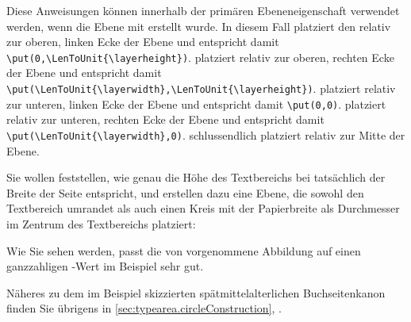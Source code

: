 \begin{Declaration}
\end{Declaration}
Diese Anweisungen können innerhalb der
primären Ebeneneigenschaft  verwendet werden, wenn die Ebene
mit  erstellt wurde. In diesem Fall platziert
 den  relativ zur oberen, linken Ecke der Ebene und
entspricht damit
\lstinline[breaklines=false]|\put(0,\LenToUnit{\layerheight})|. 
platziert  relativ zur oberen, rechten Ecke der Ebene und
entspricht damit
\lstinline[breaklines=false]
|\put(\LenToUnit{\layerwidth},\LenToUnit{\layerheight})|.
\iffree{}{\unskip\linebreak}%
 platziert  relativ zur unteren, linken Ecke der
Ebene und entspricht damit
\lstinline[breaklines=false]|\put(0,0)|.  platziert
 relativ zur unteren, rechten Ecke der Ebene und entspricht
damit
\lstinline[breaklines=false]|\put(\LenToUnit{\layerwidth},0)|. 
schlussendlich platziert  relativ zur Mitte der Ebene.%
%
\begin{Example}
  Sie wollen feststellen, wie genau die Höhe des Textbereichs bei
   tatsächlich der Breite der Seite
  entspricht, und erstellen dazu eine Ebene, die sowohl den Textbereich
  umrandet als auch einen Kreis mit der Papierbreite als Durchmesser im
  Zentrum des Textbereichs platziert:
  Wie Sie sehen werden, passt die von  vorgenommene
  Abbildung auf einen ganzzahligen -Wert im Beispiel sehr gut.
\end{Example}
Näheres zu dem im Beispiel skizzierten spätmittelalterlichen Buchseitenkanon
finden Sie übrigens in \autoref{sec:typearea.circleConstruction},
.

